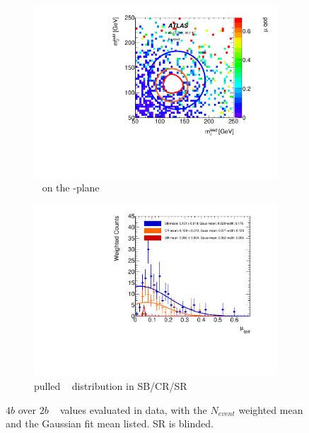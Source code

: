 \begin{figure}[htbp!]
\centering
\captionsetup{justification=centering}
	\hspace{-1cm}
    \begin{subfigure}[b]{0.4\textwidth}
        \includegraphics[width=\textwidth,angle=-90]{figures/boosted/AppendixMuqcdstudy/FourTag_Incl_mH0H1.pdf}
        \caption{\muqcd~ on the \mleadJ-\msublJ plane}
        \label{fig:app-muqcd-4b-2d}
    \end{subfigure}
    \quad \quad \quad \quad 
    \begin{subfigure}[b]{0.4\textwidth}
        \includegraphics[width=\textwidth,angle=-90]{figures/boosted/AppendixMuqcdstudy/FourTag_Incl_mH0H1_pull.pdf}
        \caption{pulled \muqcd~ distribution in SB/CR/SR}
        \label{fig:app-muqcd-4b-pull}
    \end{subfigure}
\caption{$4b$ over $2b$ \muqcd~ values evaluated in data, with the $N_{event}$ weighted mean and the Gaussian fit mean listed. SR is blinded.}
\label{fig:app-muqcd-4b}
\end{figure}

